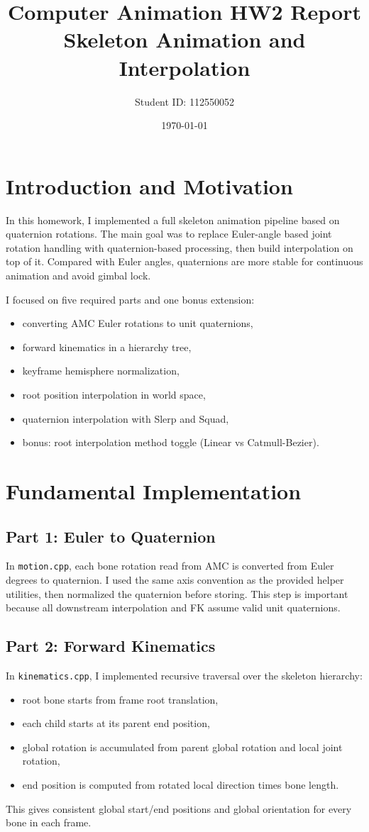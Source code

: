 \documentclass[11pt,a4paper]{article}
\title{Computer Animation HW2 Report\\Skeleton Animation and Interpolation}
\author{Student ID: 112550052}
\date{\today}
\begin{document}
\maketitle

\section{Introduction and Motivation}
In this homework, I implemented a full skeleton animation pipeline based on quaternion rotations.
The main goal was to replace Euler-angle based joint rotation handling with quaternion-based processing, then build interpolation on top of it.
Compared with Euler angles, quaternions are more stable for continuous animation and avoid gimbal lock.

I focused on five required parts and one bonus extension:
\begin{itemize}
    \item converting AMC Euler rotations to unit quaternions,
    \item forward kinematics in a hierarchy tree,
    \item keyframe hemisphere normalization,
    \item root position interpolation in world space,
    \item quaternion interpolation with Slerp and Squad,
    \item bonus: root interpolation method toggle (Linear vs Catmull-Bezier).
\end{itemize}

\section{Fundamental Implementation}

\subsection{Part 1: Euler to Quaternion}
In \texttt{motion.cpp}, each bone rotation read from AMC is converted from Euler degrees to quaternion.
I used the same axis convention as the provided helper utilities, then normalized the quaternion before storing.
This step is important because all downstream interpolation and FK assume valid unit quaternions.

\subsection{Part 2: Forward Kinematics}
In \texttt{kinematics.cpp}, I implemented recursive traversal over the skeleton hierarchy:
\begin{itemize}
    \item root bone starts from frame root translation,
    \item each child starts at its parent end position,
    \item global rotation is accumulated from parent global rotation and local joint rotation,
    \item end position is computed from rotated local direction times bone length.
\end{itemize}
This gives consistent global start/end positions and global orientation for every bone in each frame.
\end{document}
